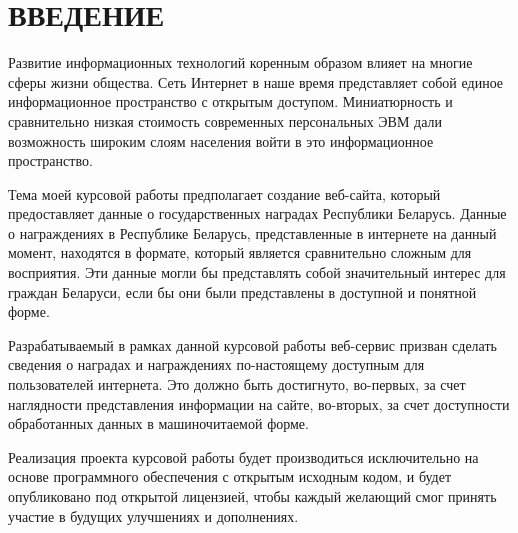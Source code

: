 \section*{ВВЕДЕНИЕ}

Развитие информационных технологий коренным образом влияет 
на многие сферы жизни общества.
Сеть Интернет в наше время представляет собой единое
информационное пространство с открытым доступом.
Миниатюрность и сравнительно низкая стоимость современных
персональных ЭВМ дали возможность широким слоям населения
войти в это информационное пространство.

Тема моей курсовой работы предполагает создание веб-сайта,
который предоставляет данные о государственных наградах 
Республики Беларусь.
Данные о награждениях в Республике Беларусь, 
представленные в интернете на данный момент, находятся в формате, 
который является сравнительно сложным для восприятия.
Эти данные могли бы представлять собой значительный интерес для
граждан Беларуси, если бы они были представлены в доступной и понятной форме.

Разрабатываемый в рамках данной курсовой работы веб-сервис призван
сделать сведения о наградах и награждениях
по-настоящему доступным для пользователей интернета.
Это должно быть достигнуто, во-первых, за счет наглядности представления 
информации на сайте, во-вторых, за счет доступности
обработанных данных в машиночитаемой форме. 

Реализация проекта курсовой работы будет производиться исключительно 
на основе программного обеспечения с открытым исходным кодом,
и будет опубликовано под открытой лицензией, чтобы каждый желающий
смог принять участие в будущих улучшениях и дополнениях.
